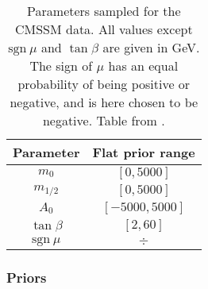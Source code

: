 \documentclass[twoside,english]{uiofysmaster}
\begin{document}
{{\begin{table}
\centering
\begin{tabular}{@{}cc@{}} \toprule
Parameter & Flat prior range\\ \midrule
$m_0$ & $[0, 5000]$\\
$m_{1/2}$ & $[0, 5000]$ \\
$A_0$ & $[-5000, 5000]$ \\
$\tan \beta$ & $[2, 60]$ \\
$\mathrm{sgn}~\mu$ & $\div$\\ \bottomrule
\end{tabular}
\caption{Parameters sampled for the CMSSM data. All values except $\mathrm{sgn}~\mu$ and $\tan \beta$ are given in GeV. The sign of $\mu$ has an equal probability of being positive or negative, and is here chosen to be negative. Table from \cite{sparre2018fast}.}
\label{Tab:: evaluating cross : Feature distributions CMSSM}
\end{table}

\subsubsection{Priors}





}}
\end{document}
